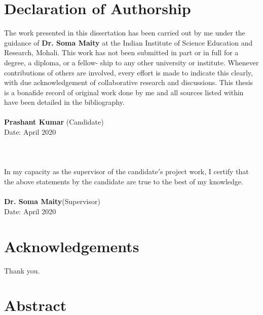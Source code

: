 \documentclass[oneside]{book}
\begin{document}
\chapter*{Declaration of Authorship}
The work presented in this dissertation has been carried out by me under the guidance of \textbf{Dr. Soma Maity} at the Indian Institute of Science Education and Research, Mohali.
This work has not been submitted in part or in full for a degree, a diploma, or a fellow- ship to any other university or institute. Whenever contributions of others are involved, every effort is made to indicate this clearly, with due acknowledgement of collaborative research and discussions. This thesis is a bonafide record of original work done by me and all sources listed within have been detailed in the bibliography.\\
\\
\textbf{Prashant Kumar} (Candidate)\\
Date: April 2020\\
\\
\\
\\
In my capacity as the supervisor of the candidate$'$s project work, I certify that the above statements by the candidate are true to the best of my knowledge.\\
\\
\textbf{Dr. Soma Maity}(Supervisor)\\
Date: April 2020
\thispagestyle{empty}
\chapter*{Acknowledgements}
Thank you.
\thispagestyle{empty}
\chapter*{Abstract}
\end{document}
